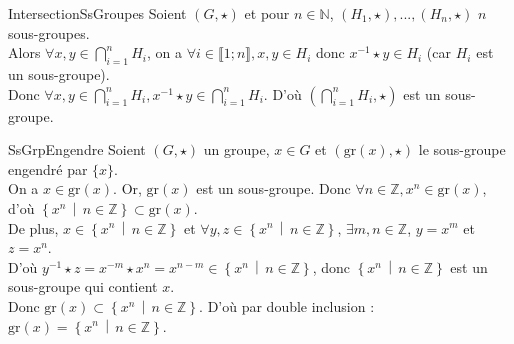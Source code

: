 \documentclass[12pt,a4paper]{report}
\begin{document}
    \begin{demonstration}{IntersectionSsGroupes}
    Soient $(G, \star)$ et pour $n \in \mathbb{N}$, $(H_1, \star), ..., (H_n, \star)$ $n$ sous-groupes.\\
    Alors $\displaystyle \forall x, y \in \bigcap_{i = 1}^n H_i$, on a $\forall i \in \llbracket 1 ; n \rrbracket, x, y \in H_i$ donc $x^{-1} \star y \in H_i$ (car $H_i$ est un sous-groupe).\\
    Donc $\displaystyle \forall x, y \in \bigcap_{i = 1}^n H_i, x^{-1} \star y \in \bigcap_{i = 1}^n H_i$. D'où $\displaystyle \left(\bigcap_{i = 1}^n H_i, \star\right)$ est un sous-groupe.
    \end{demonstration}
    
    \begin{demonstration}{SsGrpEngendre}
     Soient $(G, \star)$ un groupe, $x \in G$ et $(\text{gr}(x), \star)$ le sous-groupe engendré par $\lbrace x \rbrace$.\\
     On a $x \in \text{gr}(x)$. Or, $\text{gr}(x)$ est un sous-groupe. Donc $\forall n \in \mathbb{Z}, x^n \in \text{gr}(x)$, d'où $\left\lbrace x^n \,\middle|\, n \in \mathbb{Z} \right\rbrace \subset \text{gr}(x)$.\\
     De plus, $x \in \left\lbrace x^n \,\middle|\, n \in \mathbb{Z} \right\rbrace$ et $\forall y, z \in \left\lbrace x^n \,\middle|\, n \in \mathbb{Z} \right\rbrace$, $\exists m, n \in \mathbb{Z}$, $y = x^m$ et $z = x^n$.\\
     D'où $y^{-1} \star z = x^{-m} \star x^n = x^{n-m} \in \left\lbrace x^n \,\middle|\, n \in \mathbb{Z} \right\rbrace$, donc $\left\lbrace x^n \,\middle|\, n \in \mathbb{Z} \right\rbrace$ est un sous-groupe qui contient $x$.\\
     Donc $\text{gr}(x) \subset \left\lbrace x^n \,\middle|\, n \in \mathbb{Z} \right\rbrace$. D'où par double inclusion : $\text{gr}(x) = \left\lbrace x^n \,\middle|\, n \in \mathbb{Z} \right\rbrace$.
    \end{demonstration}
\end{document}
